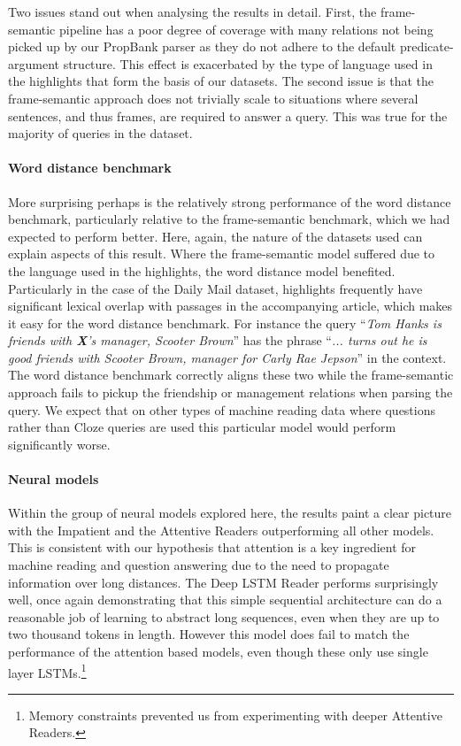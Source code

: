Two issues stand out when analysing the results in detail. First, the
frame-semantic pipeline has a poor degree of coverage with many relations not
being picked up by our PropBank parser as they do not adhere to the default
predicate-argument structure. This effect is exacerbated by the type of language
used in the highlights that form the basis of our datasets.
The second issue is that the frame-semantic approach does not trivially scale to
situations where several sentences, and thus frames, are required to answer a
query. This was true for the majority of queries in the dataset.


\paragraph{Word distance benchmark}

More surprising perhaps is the relatively strong performance of the word
distance benchmark, particularly relative to the frame-semantic benchmark, which
we had expected to perform better. Here, again, the nature of the datasets used
can explain aspects of this result. Where the frame-semantic model suffered due
to the language used in the highlights, the word distance model benefited.
Particularly in the case of the Daily Mail dataset, highlights frequently have
significant lexical overlap with passages in the accompanying article,
which makes it easy for the word distance benchmark.
For instance the query ``\textit{Tom Hanks is friends with {\bf X}'s
manager, Scooter Brown}'' has the phrase ``\textit{... turns out he is good
friends with Scooter Brown, manager for Carly Rae Jepson}'' in the context. The
word distance benchmark correctly aligns these two while the frame-semantic
approach fails to pickup the friendship or management relations when parsing
the query.
We expect that on other types of machine reading data where questions rather
than Cloze queries are used this particular model would perform significantly
worse.


\paragraph{Neural models}

Within the group of neural models explored here, the results paint a clear
picture with the Impatient and the Attentive Readers outperforming all other
models. This is consistent with our hypothesis that attention is a key
ingredient for machine reading and question answering due to the need to
propagate information over long distances.  The Deep LSTM Reader
performs surprisingly well, once again demonstrating that this simple sequential
architecture can do a reasonable job of learning to abstract long sequences,
even when they are up to two thousand tokens in length.  However this model does
fail to match the performance of the attention based models, even though these
only use single layer LSTMs.\footnote{Memory constraints prevented us from
experimenting with deeper Attentive Readers.}

